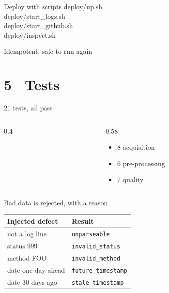 \documentclass[aspectratio=169,11pt]{beamer}
\newcommand{\bignum}[3]{\begin{minipage}[t]{#1}\centering{\fontsize{34}{36}\selectfont\bfseries\color{#2}#3}\end{minipage}}
\begin{document}
\begin{frame}[fragile]{Deploy with scripts}
  \vspace{0.3cm}
  {\fontsize{11}{15}\selectfont\ttfamily
  deploy/up.sh\\
  deploy/start\_logs.sh\\
  deploy/start\_github.sh\\
  deploy/inspect.sh}

  \vspace{0.8cm}
  {\large Idempotent: safe to run again}
\end{frame}

\section{5 \ Tests}
\begin{frame}{21 tests, all pass}
  \begin{columns}[c]
    \begin{column}{0.4\textwidth}
      \centering\bignum{4cm}{okc}{21/21}
    \end{column}
    \begin{column}{0.58\textwidth}
      \begin{itemize}
        \item 8 acquisition
        \item 6 pre-processing
        \item 7 quality
      \end{itemize}
    \end{column}
  \end{columns}

  \vspace{0.6cm}
\end{frame}

\begin{frame}{Bad data is rejected, with a reason}
  \centering\vspace{0.2cm}
  \large
  \begin{tabular}{@{}p{4.6cm}p{4.2cm}@{}}
    \toprule
    \textbf{Injected defect} & \textbf{Result} \\
    \midrule
    not a log line & \texttt{unparseable} \\
    status 999 & \texttt{invalid\_status} \\
    method FOO & \texttt{invalid\_method} \\
    date one day ahead & \texttt{future\_timestamp} \\
    date 30 days ago & \texttt{stale\_timestamp} \\
    \bottomrule
  \end{tabular}
\end{frame}
\end{document}
